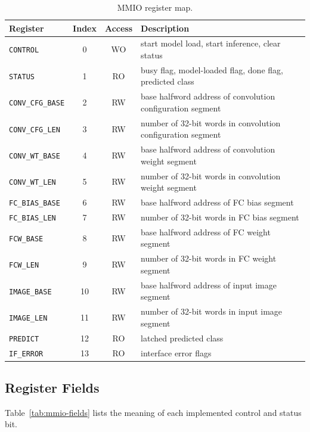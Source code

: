 \begin{table}[h]
\centering
\small
\begin{tabular}{|l|c|c|p{7.2cm}|}
\hline
\textbf{Register} & \textbf{Index} & \textbf{Access} & \textbf{Description} \\
\hline
\texttt{CONTROL} & 0 & WO & start model load, start inference, clear status \\
\hline
\texttt{STATUS} & 1 & RO & busy flag, model-loaded flag, done flag, predicted class \\
\hline
\texttt{CONV\_CFG\_BASE} & 2 & RW & base halfword address of convolution configuration segment \\
\hline
\texttt{CONV\_CFG\_LEN} & 3 & RW & number of 32-bit words in convolution configuration segment \\
\hline
\texttt{CONV\_WT\_BASE} & 4 & RW & base halfword address of convolution weight segment \\
\hline
\texttt{CONV\_WT\_LEN} & 5 & RW & number of 32-bit words in convolution weight segment \\
\hline
\texttt{FC\_BIAS\_BASE} & 6 & RW & base halfword address of FC bias segment \\
\hline
\texttt{FC\_BIAS\_LEN} & 7 & RW & number of 32-bit words in FC bias segment \\
\hline
\texttt{FCW\_BASE} & 8 & RW & base halfword address of FC weight segment \\
\hline
\texttt{FCW\_LEN} & 9 & RW & number of 32-bit words in FC weight segment \\
\hline
\texttt{IMAGE\_BASE} & 10 & RW & base halfword address of input image segment \\
\hline
\texttt{IMAGE\_LEN} & 11 & RW & number of 32-bit words in input image segment \\
\hline
\texttt{PREDICT} & 12 & RO & latched predicted class \\
\hline
\texttt{IF\_ERROR} & 13 & RO & interface error flags \\
\hline
\end{tabular}
\caption{MMIO register map.}
\label{tab:mmio-reg-map}
\end{table}

\subsection{Register Fields}

Table~\ref{tab:mmio-fields} lists the meaning of each implemented control and
status bit.

